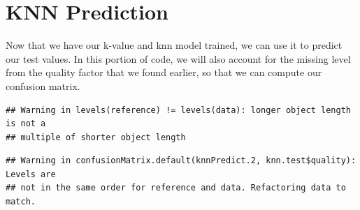\documentclass[
]{book}
\newenvironment{Shaded}{\begin{snugshade}}{\end{snugshade}}
\newcommand{\AttributeTok}[1]{\textcolor[rgb]{0.77,0.63,0.00}{#1}}
\newcommand{\CommentTok}[1]{\textcolor[rgb]{0.56,0.35,0.01}{\textit{#1}}}
\newcommand{\FloatTok}[1]{\textcolor[rgb]{0.00,0.00,0.81}{#1}}
\newcommand{\FunctionTok}[1]{\textcolor[rgb]{0.00,0.00,0.00}{#1}}
\newcommand{\NormalTok}[1]{#1}
\newcommand{\OtherTok}[1]{\textcolor[rgb]{0.56,0.35,0.01}{#1}}
\newcommand{\SpecialCharTok}[1]{\textcolor[rgb]{0.00,0.00,0.00}{#1}}
\begin{document}
\hypertarget{knn-prediction}{%
\section{KNN Prediction}\label{knn-prediction}}

Now that we have our k-value and knn model trained, we can use it to predict our test values. In this portion of code, we will also account for the missing level from the quality factor that we found earlier, so that we can compute our confusion matrix.

\begin{Shaded}
\end{Shaded}

\begin{verbatim}
## Warning in levels(reference) != levels(data): longer object length is not a
## multiple of shorter object length
\end{verbatim}

\begin{verbatim}
## Warning in confusionMatrix.default(knnPredict.2, knn.test$quality): Levels are
## not in the same order for reference and data. Refactoring data to match.
\end{verbatim}
\end{document}
